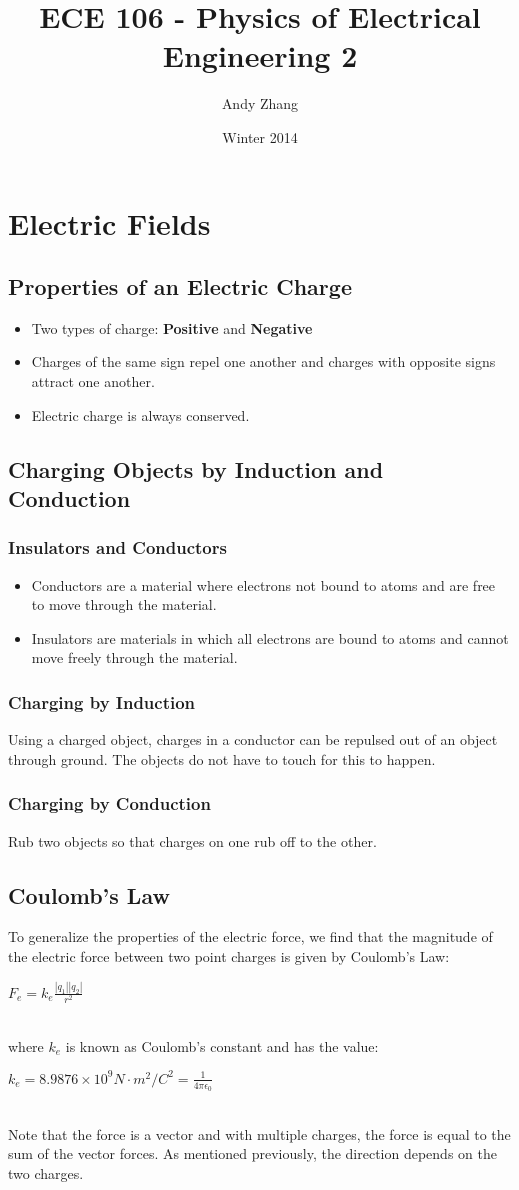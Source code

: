 \documentclass{report}
\title{ECE 106 - Physics of Electrical Engineering 2}
\author{Andy Zhang}
\date{Winter 2014}
\begin{document}
\maketitle
\tableofcontents
\chapter{Electric Fields}
	\section{Properties of an Electric Charge}
		\begin{itemize}
			\item Two types of charge: \textbf{Positive} and \textbf{Negative}
			\item Charges of the same sign repel one another and charges with opposite signs attract one another.
			\item Electric charge is always conserved.
		\end{itemize}
	\section{Charging Objects by Induction and Conduction}
		\subsection{Insulators and Conductors}
		\begin{itemize}
			\item Conductors are a material where electrons not bound to atoms and are free to move through the material.
			\item Insulators are materials in which all electrons are bound to atoms and cannot move freely through the material.
		\end{itemize}
		\subsection{Charging by Induction}
			Using a charged object, charges in a conductor can be repulsed out of an object through ground. The objects do not have to touch for this to happen.
		\subsection{Charging by Conduction}
			Rub two objects so that charges on one rub off to the other.
	\section{Coulomb's Law}
		To generalize the properties of the electric force, we find that the magnitude of the electric force between two point charges is given by Coulomb's Law:\\
		\centerline{$F_e = k_e \frac{|q_1||q_2|}{r^2}$}\\
		where $k_e$ is known as Coulomb's constant and has the value:\\
		\centerline{$k_e = 8.9876 \times 10^9 N \cdot m^2/C^2 = \frac{1}{4\pi \epsilon_0}$ }\\
		Note that the force is a vector and with multiple charges, the force is equal to the sum of the vector forces. As mentioned previously, the direction depends on the two charges.
\end{document}
